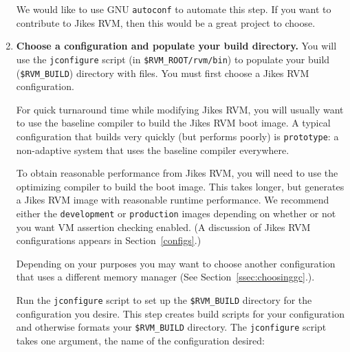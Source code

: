 \begin{enumerate}

We would like to use GNU {\tt autoconf} to automate this
step.  If you want to contribute to Jikes RVM, then this would be a
great project to choose.

\item {\bf Choose a configuration and populate your build directory.}
You will use the {\tt jconfigure} script (in {\tt \$RVM\_ROOT/rvm/bin}) to
populate your build ({\tt \$RVM\_BUILD}) directory with files.  You must
first choose a Jikes RVM configuration.

For quick turnaround time while modifying Jikes RVM, you will usually
want to use the baseline compiler to build the Jikes RVM boot image.
A typical configuration that builds very quickly (but performs poorly)
is {\tt prototype}: a non-adaptive system that uses the
baseline compiler everywhere.

To obtain reasonable performance from Jikes RVM, you will need to use
the optimizing compiler to build the boot image.  This takes longer,
but generates a Jikes RVM image with reasonable runtime performance.
We recommend either the {\tt development} or {\tt production} images
depending on whether or not you want VM assertion checking enabled. (A
discussion  of Jikes RVM configurations appears in
Section~\ref{configs}.) 

Depending on your purposes you may want to choose another
configuration that uses a different memory manager (See
Section~\ref{ssec:choosinggc}.).

Run the {\tt jconfigure} script to set up the {\tt \$RVM\_BUILD}
directory for the configuration you desire.  This step creates
build scripts for your configuration and otherwise formats your
{\tt \$RVM\_BUILD} directory.
The {\tt jconfigure} script takes one argument, the name of the
configuration desired: 


\end{enumerate}
